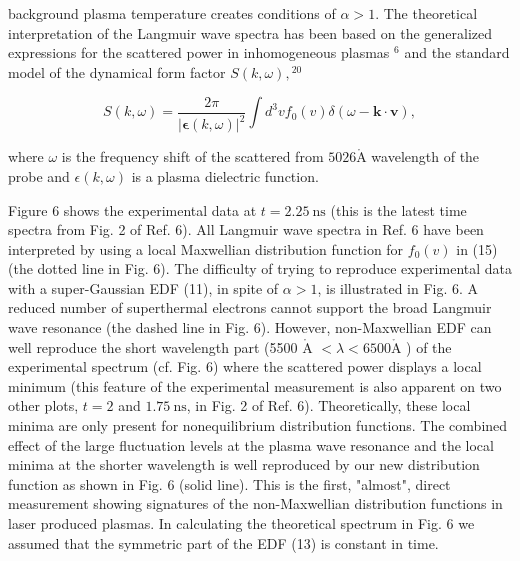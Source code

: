 \documentclass[10pt]{article}
\def\AA{\mathring{\mathrm{A}}}
\begin{document}
background plasma temperature creates conditions of $\alpha>1$. The theoretical interpretation of the Langmuir wave spectra has been based on the generalized expressions for the scattered power in inhomogeneous plasmas $^{6}$ and the standard model of the dynamical form factor $S(k, \omega),{ }^{20}$

$$
S(k, \omega)=\frac{2 \pi}{|\boldsymbol{\epsilon}(k, \omega)|^{2}} \int d^{3} v f_{0}(v) \delta(\omega-\mathbf{k} \cdot \mathbf{v}),
$$

where $\omega$ is the frequency shift of the scattered from $5026 \AA$ wavelength of the probe and $\epsilon(k, \omega)$ is a plasma dielectric function.

Figure 6 shows the experimental data at $t=2.25 \mathrm{~ns}$ (this is the latest time spectra from Fig. 2 of Ref. 6). All Langmuir wave spectra in Ref. 6 have been interpreted by using a local Maxwellian distribution function for $f_{0}(v)$ in (15) (the dotted line in Fig. 6). The difficulty of trying to reproduce experimental data with a super-Gaussian EDF (11), in spite of $\alpha>1$, is illustrated in Fig. 6. A reduced number of superthermal electrons cannot support the broad Langmuir wave resonance (the dashed line in Fig. 6). However, non-Maxwellian EDF can well reproduce the short wavelength part (5500 $\AA$ $<\lambda<6500 \AA$ ) of the experimental spectrum (cf. Fig. 6) where the scattered power displays a local minimum (this feature of the experimental measurement is also apparent on two other plots, $t=2$ and $1.75 \mathrm{~ns}$, in Fig. 2 of Ref. 6). Theoretically, these local minima are only present for nonequilibrium distribution functions. The combined effect of the large fluctuation levels at the plasma wave resonance and the local minima at the shorter wavelength is well reproduced by our new distribution function as shown in Fig. 6 (solid line). This is the first, "almost", direct measurement showing signatures of the non-Maxwellian distribution functions in laser produced plasmas. In calculating the theoretical spectrum in Fig. 6 we assumed that the symmetric part of the EDF (13) is constant in time.
\end{document}
